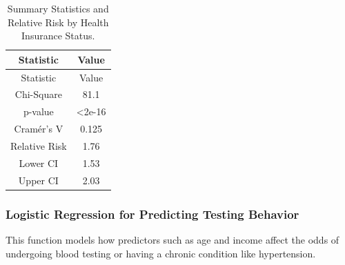 \documentclass[
]{article}
\begin{document}
\begin{longtable}[]{@{}cc@{}}
\caption{Summary Statistics and Relative Risk by Health Insurance
Status.}\tabularnewline
\toprule\noalign{}
Statistic & Value \\
\midrule\noalign{}
\endfirsthead
\toprule\noalign{}
Statistic & Value \\
\midrule\noalign{}
\endhead
\bottomrule\noalign{}
\endlastfoot
Chi-Square & 81.1 \\
p-value & \textless2e-16 \\
Cramér's V & 0.125 \\
Relative Risk & 1.76 \\
Lower CI & 1.53 \\
Upper CI & 2.03 \\
\end{longtable}

\subsubsection{Logistic Regression for Predicting Testing
Behavior}\label{logistic-regression-for-predicting-testing-behavior}

This function models how predictors such as age and income affect the
odds of undergoing blood testing or having a chronic condition like
hypertension.
\end{document}
